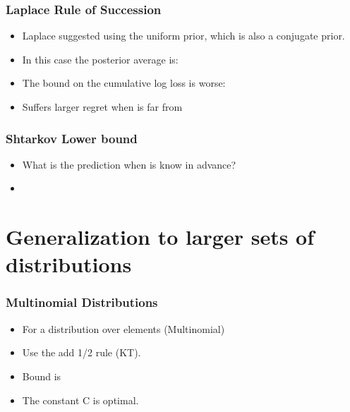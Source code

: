 \documentclass[handout]{beamer}
\begin{document}
\begin{frame}
\frametitle{Laplace Rule of Succession}
\begin{itemize}
\item
Laplace suggested using the uniform prior, which is also a conjugate prior.
\item In this case the posterior average is:
\R{\[
\frac{\int_0^1 \theta^{n+1} (1-\theta)^{t-n} d\theta}
{\int_0^1 \theta^{n} (1-\theta)^{t-n} d\theta}
=
\frac{n+1}{t+2}
\]}
\item
The bound on the cumulative log loss is worse:
\R{\[
\TAloss - \BEloss = \ln T + O(1)
\]}
\item
Suffers larger regret when \R{$\btheta$} is far from 
\end{itemize}
\end{frame}



\begin{frame}
\frametitle{Shtarkov Lower bound}
\begin{itemize}
\item What is the  prediction when  is know in
  advance?
\item
{}
\end{itemize}
\end{frame}

\section{Generalization to larger sets of distributions}

\begin{frame}
\frametitle{Multinomial Distributions}
\begin{itemize}
\item For a distribution over  elements (Multinomial) 
\item Use the add 1/2 rule (KT).
\R{\[
p(i) = \frac{n_i+1/2}{t+k/2}
\]}
\item Bound is
\item 
The constant C is optimal.
\end{itemize}
\end{frame}
\end{document}
